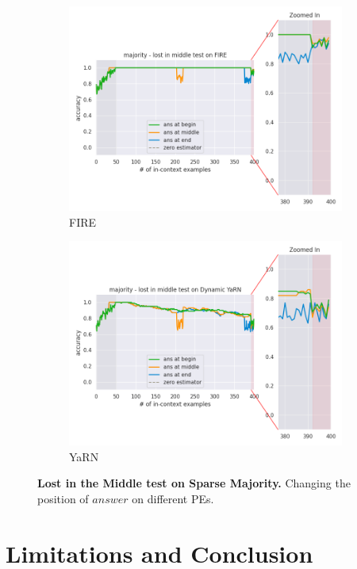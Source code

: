 \documentclass[letterpaper]{article} %
\begin{document}
\begin{figure}[tp]
\begin{subfigure}[t]{0.48\linewidth}
        \includegraphics[width=\linewidth]{AnonymousSubmission/LaTeX/imgs/analysis/serial-majority/fire_lost.png}
        \caption{FIRE}
    \end{subfigure}
    \begin{subfigure}[t]{0.48\linewidth}
        \includegraphics[width=\linewidth]{AnonymousSubmission/LaTeX/imgs/analysis/serial-majority/dyarn_lost.png}
        \caption{YaRN}
    \end{subfigure}
    \caption{\small\textbf{Lost in the Middle test on Sparse Majority.} Changing the position of $answer$ on different PEs.}
    \label{fig:serial-majority}
\end{figure}

\section{Limitations and Conclusion}
\end{document}
